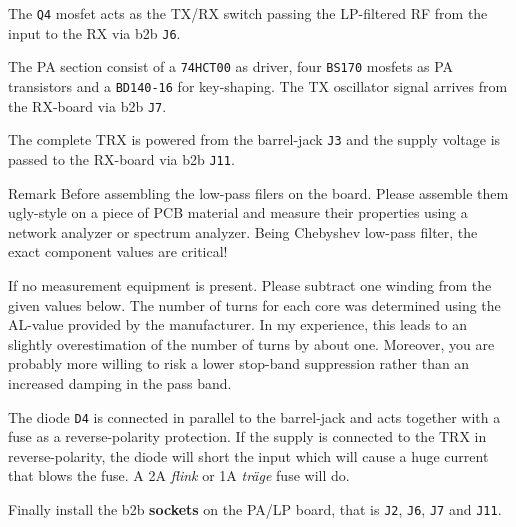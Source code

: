 \documentclass[10pt, a4paper,twoside]{scrartcl}
\newenvironment{remark}{\begin{bclogo}[couleur=blue!30,arrondi=.1,logo=\bcinfo,ombre=true]{Remark}}{\end{bclogo}}
\begin{document}
The \texttt{Q4} mosfet acts as the TX/RX switch passing the LP-filtered RF from the input to the RX via b2b \texttt{J6}.

The PA section consist of a \texttt{74HCT00} as driver, four \texttt{BS170} mosfets as PA transistors and a \texttt{BD140-16} for key-shaping. The TX oscillator signal arrives from the RX-board via b2b \texttt{J7}.

The complete TRX is powered from the barrel-jack \texttt{J3} and the supply voltage is passed to the RX-board via b2b \texttt{J11}. 

\begin{remark}
 Before assembling the low-pass filers on the board. Please assemble them ugly-style on a piece of PCB material and measure their properties using a network analyzer or spectrum analyzer. Being Chebyshev low-pass filter, the exact component values are critical!
\end{remark}

 If no measurement equipment is present. Please subtract one winding from the given values below. The number of turns for each core was determined using the AL-value provided by the manufacturer. In my experience, this leads to an slightly overestimation of the number of turns by about one. Moreover, you are probably more willing to risk a lower stop-band suppression rather than an increased damping in the pass band.
 
 The diode \texttt{D4} is connected in parallel to the barrel-jack and acts together with a fuse as a reverse-polarity protection. If the supply is connected to the TRX in reverse-polarity, the diode will short the input which will cause a huge current that blows the fuse. A 2A \emph{flink} or 1A \emph{träge} fuse will do.
 
 Finally install the b2b \textbf{sockets} on the PA/LP board, that is \texttt{J2}, \texttt{J6}, \texttt{J7} and \texttt{J11}.
 
\clearpage
\end{document}
